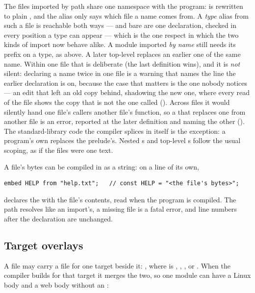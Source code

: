 The files imported by path share one namespace with the program:
 is rewritten to plain , and the alias only says which
file a name comes from. A \emph{type} alias from such a file is reachable
both ways ---  and bare  are one declaration, checked in every
position a type can appear --- which is the one respect in which the two kinds
of import now behave alike. A module imported \emph{by name} still needs its
prefix on a type, as above.
A later top-level  replaces an earlier one of the same name.
Within one file that is deliberate (the last definition wins), and it is
\emph{not} silent: declaring a name twice in one file is a warning that
names the line the earlier declaration is on, because the case that
matters is the one nobody notices --- an edit that left an old copy
behind, shadowing the new one, where every read of the file shows the
copy that is not the one called (). Across files it would silently hand one file's
callers another file's function, so a  that replaces one from
another file is an error, reported at the later definition and naming the
other (). The standard-library code the compiler
splices in itself is the exception: a program's own 
replaces the prelude's. Nested s and top-level s follow
the usual scoping, as if the files were one text.

A file's bytes can be compiled in as a string: on a line of its own,

\begin{lstlisting}
embed HELP from "help.txt";   // const HELP = "<the file's bytes>";
\end{lstlisting}

\noindent declares the  with the file's contents, read when the
program is compiled. The path resolves like an import's, a missing file
is a fatal error, and line numbers after the declaration are unchanged.

\subsection{Target overlays}
\label{sec:overlays}

A file  may carry a file for one target beside it:
, where  is , ,
,  or . When the compiler builds for that
target it merges the two, so one module can have a Linux body and a web
body without an :

